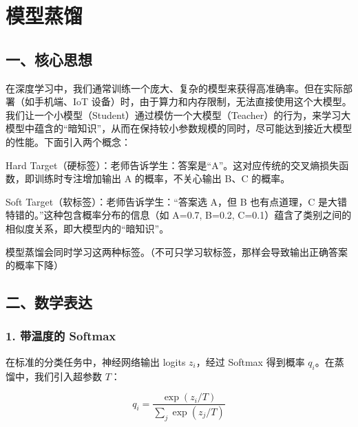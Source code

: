 \setcounter{section}{1}

\hypertarget{ux6a21ux578bux84b8ux998f}{%
\section{模型蒸馏}\label{ux6a21ux578bux84b8ux998f}}

\hypertarget{ux4e00ux6838ux5fc3ux601dux60f3-7}{%
\subsection{一、核心思想}\label{ux4e00ux6838ux5fc3ux601dux60f3-7}}

在深度学习中，我们通常训练一个庞大、复杂的模型来获得高准确率。但在实际部署（如手机端、IoT 设备）时，由于算力和内存限制，无法直接使用这个大模型。我们让一个小模型（Student）通过模仿一个大模型（Teacher）的行为，来学习大模型中蕴含的``暗知识''，从而在保持较小参数规模的同时，尽可能达到接近大模型的性能。下面引入两个概念：

Hard Target（硬标签）：老师告诉学生：答案是``A''。这对应传统的交叉熵损失函数，即训练时专注增加输出 A 的概率，不关心输出 B、C 的概率。

Soft Target（软标签）：老师告诉学生：``答案选 A，但 B 也有点道理，C 是大错特错的。''这种包含概率分布的信息（如 A=0.7, B=0.2, C=0.1）蕴含了类别之间的相似度关系，即大模型内的``暗知识''。

模型蒸馏会同时学习这两种标签。（不可只学习软标签，那样会导致输出正确答案的概率下降）

\hypertarget{ux4e8cux6570ux5b66ux8868ux8fbe-2}{%
\subsection{二、数学表达}\label{ux4e8cux6570ux5b66ux8868ux8fbe-2}}

\hypertarget{ux5e26ux6e29ux5ea6ux7684-softmax}{%
\subsubsection{1. 带温度的 Softmax}\label{ux5e26ux6e29ux5ea6ux7684-softmax}}

在标准的分类任务中，神经网络输出 logits \(z_i\)，经过 Softmax 得到概率 \(q_i\)。在蒸馏中，我们引入超参数 \(T\)：

\[
q_i = \frac{\exp(z_i / T)}{\sum_j \exp(z_j / T)}
\]

